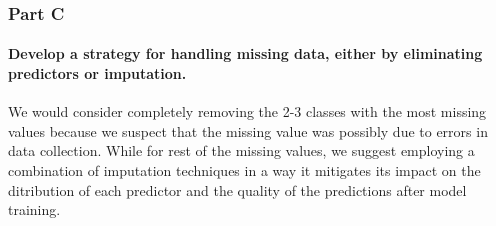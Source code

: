\documentclass[
  11pt,
]{article}
\let\oldparagraph\paragraph
\renewcommand{\paragraph}[1]{\oldparagraph{#1}\mbox{}}
\begin{document}
\subsubsection{Part C}\label{part-c-1}

\paragraph{Develop a strategy for handling missing data, either by
eliminating predictors or
imputation.}\label{develop-a-strategy-for-handling-missing-data-either-by-eliminating-predictors-or-imputation.}

We would consider completely removing the 2-3 classes with the most
missing values because we suspect that the missing value was possibly
due to errors in data collection. While for rest of the missing values,
we suggest employing a combination of imputation techniques in a way it
mitigates its impact on the ditribution of each predictor and the
quality of the predictions after model training.
\end{document}
